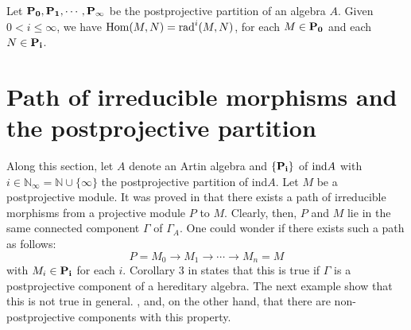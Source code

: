 \begin{lem}
\label{lemadan}
Let  $ \bf{P_0},\bf{P_1}, \cdots, {\bf P_{\infty}}$ be the postprojective partition of an algebra $A$. Given $0<i \leq {\infty}$, we have ${\rm Hom}(M,N)={\rm rad}^i(M,N)$, for each $ M \in \bf{P_0}$ and each $ N \in \bf{P_i}$.
\end{lem}

\section{Path of irreducible morphisms and the postprojective partition}

Along this section, let $A$ denote an Artin algebra and $\{ \bf{P_i} \}$ of ${\rm ind}A$ with $i\in
\mathbb{N}_{\infty}=\mathbb{N}\cup{\{ \infty} \}$ the postprojective partition of ind$A$. Let $M$ be 
a postprojective module. It was proved  in \cite{auslander} that there exists a path of irreducible morphisms 
from a projective module $P$ to $M$. Clearly, then, $P$ and $M$ lie in the same connected component 
$\Gamma$ of $\Gamma_A$. One could wonder if there exists such a path as follows:
$$ P = M_0 {\longrightarrow} M_1 {\longrightarrow} \cdots {\longrightarrow} M_n= M$$
with $M_i \in {\bf P_i}$ for each $i$. Corollary 3 in \cite{igusa} states that this is true if $\Gamma$ is 
a postprojective component of a hereditary algebra. The next example show that this is 
not true in general. , and, on the other hand, that there are non-postprojective components with this 
property. 

